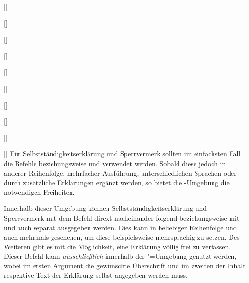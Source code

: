 \begin{Declaration*}{}
\begin{Declaration*}{}
\begin{Declaration*}{}
\begin{Declaration}[v2.02]{[]}
\begin{Declaration}[v2.04]{%
}
\begin{Declaration}{[]}
\begin{Declaration}[v2.02]{%
  []%
}
\begin{Declaration}[v2.02]{%
  []%
}
\begin{Declaration}[v2.02]{%
  []%
}
\begin{Declaration}{[\PSet]}
\begin{Declaration}{%
  []
}
\begin{Declaration}{[]}
\begin{Declaration}{[]}
\begin{Declaration}{[]}
\printdeclarationlist%
%
Für Selbstständigkeitserklärung und Sperrvermerk sollten im einfachsten Fall 
die Befehle  beziehungsweise  und 
 verwendet werden. Sobald diese jedoch in anderer Reihenfolge,  
mehrfacher Ausführung, unterschiedlichen Sprachen oder durch zusätzliche  
Erklärungen ergänzt werden, so bietet die -Umgebung 
die notwendigen Freiheiten.

Innerhalb dieser Umgebung können Selbstständigkeitserklärung und Sperrvermerk 
mit dem Befehl  direkt nacheinander folgend beziehungsweise 
mit  und  auch separat ausgegeben werden. 
Dies kann in beliebiger Reihenfolge und auch mehrmals geschehen, um diese 
beispielsweise mehrsprachig zu setzen.
 Des Weiteren gibt es mit  die 
Möglichkeit, eine Erklärung völlig frei zu verfassen. Dieser Befehl kann 
\emph{ausschließlich} innerhalb der "=Umgebung 
genutzt werden, wobei im ersten Argument die gewünschte Überschrift und im 
zweiten der Inhalt respektive Text der Erklärung selbst angegeben werden muss.


\end{Declaration}
\end{Declaration}
\end{Declaration}
\end{Declaration}
\end{Declaration}
\end{Declaration}
\end{Declaration}
\end{Declaration}
\end{Declaration}
\end{Declaration}
\end{Declaration}
\end{Declaration*}
\end{Declaration*}
\end{Declaration*}
